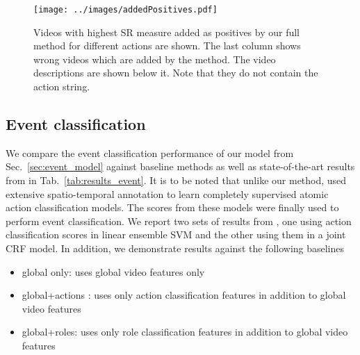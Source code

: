 \documentclass[10pt,twocolumn,letterpaper]{article}
\begin{document}
\begin{figure}[ht]
\centering
   \texttt{[image: ../images/addedPositives.pdf]}
      \caption{Videos with highest SR measure added as positives by our full method for different actions are shown. The last column shows wrong videos which are added by the method. The video descriptions are shown below it. Note that they do not contain the action string.}
\label{fig:added_positives}
\end{figure}

 

\subsection{Event classification}
We compare the event classification performance of our model from Sec.~\ref{sec:event_model} against baseline methods as well as state-of-the-art results from \cite{Izadinia_ECCV12} in Tab.~\ref{tab:results_event}. It is to be noted that unlike our method, \cite{Izadinia_ECCV12} used extensive spatio-temporal annotation to learn completely supervised atomic action classification models. The scores from these models were finally used to perform event classification. We report two sets of results from \cite{Izadinia_ECCV12}, one using action classification scores in linear ensemble SVM and the other using them in a joint CRF model. In addition, we demonstrate results against the following baselines

\vspace*{-3pt}
\begin{itemize}
 \item global only: uses global video features only \vspace*{-9pt}
 \item global+actions : uses only action classification features in addition to global video features \vspace*{-9pt}
 \item global+roles: uses only role classification features in addition to global video features \vspace*{-5pt}
\end{itemize}
\vspace*{-3pt}
\end{document}
